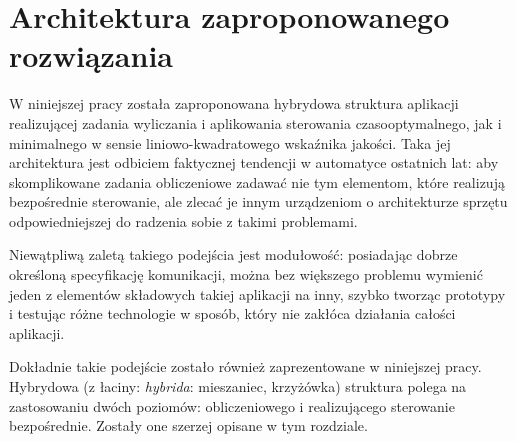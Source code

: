\chapter{Architektura zaproponowanego rozwiązania}
\label{cha:arch}

W niniejszej pracy została zaproponowana hybrydowa struktura aplikacji realizującej zadania wyliczania i aplikowania sterowania czasooptymalnego, jak i minimalnego w sensie liniowo-kwadratowego wskaźnika jakości.
Taka jej architektura jest odbiciem faktycznej tendencji w automatyce ostatnich lat: aby skomplikowane zadania obliczeniowe zadawać nie tym elementom, które realizują bezpośrednie sterowanie, ale zlecać je innym urządzeniom o architekturze sprzętu odpowiedniejszej do radzenia sobie z takimi problemami.

Niewątpliwą zaletą takiego podejścia jest modułowość: posiadając dobrze określoną specyfikację komunikacji, można bez większego problemu wymienić jeden z elementów składowych takiej aplikacji na inny, szybko tworząc prototypy i testując różne technologie w sposób, który nie zakłóca działania całości aplikacji.

Dokładnie takie podejście zostało również zaprezentowane w niniejszej pracy. Hybrydowa (z łaciny: \emph{hybrida}: mieszaniec, krzyżówka) struktura polega na zastosowaniu dwóch poziomów: obliczeniowego i realizującego sterowanie bezpośrednie. Zostały one szerzej opisane w tym rozdziale.




